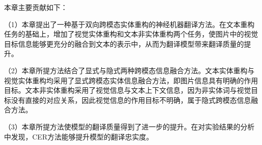 本章主要贡献如下：

（1）本章提出了一种基于双向跨模态实体重构的神经机器翻译方法。在文本重构任务的基础上，增加了视觉实体重构和文本非实体重构两个任务，使图片中的视觉目标信息能够更充分的融合到文本的表示中，从而为翻译模型带来翻译质量的提升。

（2）本章所提方法结合了显式与隐式两种跨模态信息融合方法。文本实体重构与视觉实体重构均采用了显式跨模态实体信息融合方法，即图片信息具有明确的作用目标。文本非实体重构采用了视觉信息与文本上下文信息，因为非实体词与视觉目标没有直接的对应关系，因此视觉信息的作用目标不明确，属于隐式跨模态信息融合方法。

（3）本章所提方法使模型的翻译质量得到了进一步的提升。在对实验结果的分析中发现，CER方法能够提升模型的翻译忠实度。